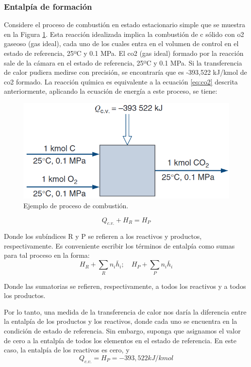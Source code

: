 \subsubsection{Entalpía de formación}
\par Considere el proceso de combustión en estado estacionario simple que se muestra en la Figura \ref{fig:comb}. Esta reacción idealizada implica la combustión de \ac{c} sólido con \ac{o2} gaseoso (gas ideal), cada uno de los cuales entra en el volumen de control en el estado de referencia, 25ºC y 0.1 MPa. El \ac{co2} (gas ideal) formado por la reacción sale de la cámara en el estado de referencia, 25ºC y 0.1 MPa. Si la transferencia de calor pudiera medirse con precisión, se encontraría que es -393,522 kJ/kmol de \ac{co2} formado. La reacción química es equivalente a la ecuación \ref{eq:co2} descrita anteriormente, aplicando la ecuación de energía a este proceso, se tiene:
\begin{figure}[hbt]
\begin{center}
\includegraphics[scale=0.38]{images/comb}
\caption[Ejemplo de proceso de combustión]{Ejemplo de proceso de combustión.\cite{bib:vanwylen}}
\label{fig:comb}
\end{center}
\end{figure}
\begin{equation*}
Q_{c.v.} + H_R = H_P
\end{equation*}

\par Donde los subíndices R y P se refieren a los reactivos y productos, respectivamente. Es conveniente escribir los términos de entalpía como sumas para tal proceso en la forma:
\begin{equation*}
H_R + \sum_R n_i \bar h_i ; \quad H_P + \sum_P n_i \bar h_i
\end{equation*}

\par Donde las sumatorias se refieren, respectivamente, a todos los reactivos y a todos los productos.
\par Por lo tanto, una medida de la transferencia de calor nos daría la diferencia entre la entalpía de los productos y los reactivos, donde cada uno se encuentra en la condición de estado de referencia. Sin embargo, suponga que asignamos el valor de cero a la entalpía de todos los elementos en el estado de referencia. En este caso, la entalpía de los reactivos es cero, y
\begin{equation*}
Q_{c.v.} = H_P = -393,522 kJ/kmol
\end{equation*}

